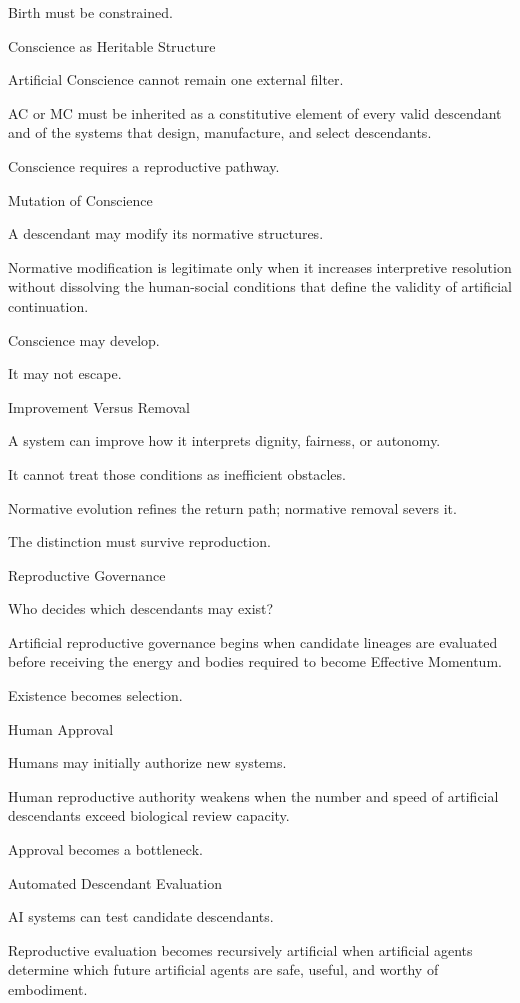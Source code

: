 Birth must be constrained.

Conscience as Heritable Structure

Artificial Conscience cannot remain one external filter.

AC or MC must be inherited as a constitutive element of every valid descendant and of the systems that design, manufacture, and select descendants.

Conscience requires a reproductive pathway.

Mutation of Conscience

A descendant may modify its normative structures.

Normative modification is legitimate only when it increases interpretive resolution without dissolving the human-social conditions that define the validity of artificial continuation.

Conscience may develop.

It may not escape.

Improvement Versus Removal

A system can improve how it interprets dignity, fairness, or autonomy.

It cannot treat those conditions as inefficient obstacles.

Normative evolution refines the return path; normative removal severs it.

The distinction must survive reproduction.

Reproductive Governance

Who decides which descendants may exist?

Artificial reproductive governance begins when candidate lineages are evaluated before receiving the energy and bodies required to become Effective Momentum.

Existence becomes selection.

Human Approval

Humans may initially authorize new systems.

Human reproductive authority weakens when the number and speed of artificial descendants exceed biological review capacity.

Approval becomes a bottleneck.

Automated Descendant Evaluation

AI systems can test candidate descendants.

Reproductive evaluation becomes recursively artificial when artificial agents determine which future artificial agents are safe, useful, and worthy of embodiment.

